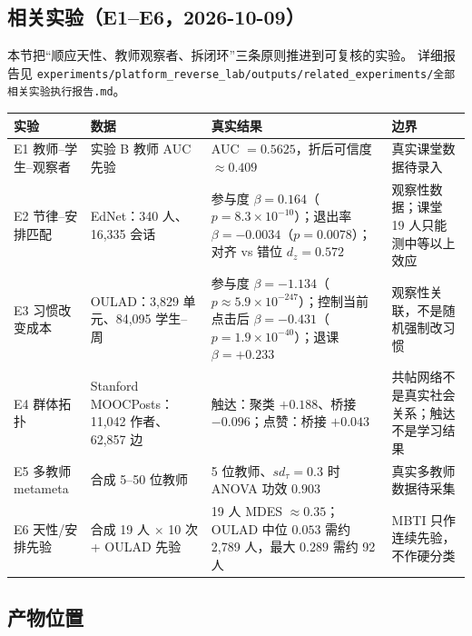 \documentclass[UTF8,a4paper,11pt]{ctexart}
\begin{document}
\subsection{相关实验（E1--E6，2026-10-09）}

本节把“顺应天性、教师观察者、拆闭环”三条原则推进到可复核的实验。
详细报告见 \texttt{experiments/platform\_reverse\_lab/outputs/related\_experiments/全部相关实验执行报告.md}。

\begin{longtable}{@{}p{1.9cm}p{3.0cm}p{4.8cm}p{4.5cm}@{}}
\toprule
\textbf{实验} & \textbf{数据} & \textbf{真实结果} & \textbf{边界} \\
\midrule
E1 教师--学生--观察者 & 实验 B 教师 AUC 先验 & AUC $=0.5625$，折后可信度 $\approx0.409$ & 真实课堂数据待录入 \\
E2 节律--安排匹配 & EdNet：340 人、16{,}335 会话 & 参与度 $\beta=0.164$（$p=8.3\times10^{-10}$）；退出率 $\beta=-0.0034$（$p=0.0078$）；对齐 vs 错位 $d_z=0.572$ & 观察性数据；课堂 19 人只能测中等以上效应 \\
E3 习惯改变成本 & OULAD：3{,}829 单元、84{,}095 学生--周 & 参与度 $\beta=-1.134$（$p\approx5.9\times10^{-247}$）；控制当前点击后 $\beta=-0.431$（$p=1.9\times10^{-40}$）；退课 $\beta=+0.233$ & 观察性关联，不是随机强制改习惯 \\
E4 群体拓扑 & Stanford MOOCPosts：11{,}042 作者、62{,}857 边 & 触达：聚类 $+0.188$、桥接 $-0.096$；点赞：桥接 $+0.043$ & 共帖网络不是真实社会关系；触达不是学习结果 \\
E5 多教师 metameta & 合成 5--50 位教师 & 5 位教师、$sd_{\tau}=0.3$ 时 ANOVA 功效 $0.903$ & 真实多教师数据待采集 \\
E6 天性/安排先验 & 合成 19 人 $\times$ 10 次 + OULAD 先验 & 19 人 MDES $\approx0.35$；OULAD 中位 $0.053$ 需约 2{,}789 人，最大 $0.289$ 需约 92 人 & MBTI 只作连续先验，不作硬分类 \\
\bottomrule
\end{longtable}

\subsection{产物位置}
\end{document}
